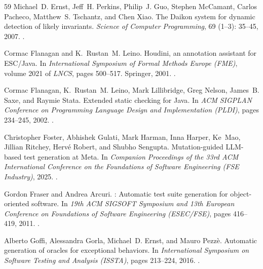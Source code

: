 \documentclass[11pt]{article}
\begin{document}
\begin{thebibliography}{59}
Michael~D. Ernst, Jeff~H. Perkins, Philip~J. Guo, Stephen McCamant, Carlos
  Pacheco, Matthew~S. Tschantz, and Chen Xiao.
\newblock The {Daikon} system for dynamic detection of likely invariants.
\newblock \emph{Science of Computer Programming}, 69 (1--3):
  35--45, 2007.
\newblock {}.

Cormac Flanagan and K.~Rustan~M. Leino.
\newblock Houdini, an annotation assistant for {ESC/Java}.
\newblock In \emph{International Symposium of Formal Methods Europe (FME)},
  volume 2021 of \emph{LNCS}, pages 500--517. Springer, 2001.
\newblock {}.

Cormac Flanagan, K.~Rustan~M. Leino, Mark Lillibridge, Greg Nelson, James~B.
  Saxe, and Raymie Stata.
\newblock Extended static checking for {Java}.
\newblock In \emph{ACM SIGPLAN Conference on Programming Language Design and
  Implementation (PLDI)}, pages 234--245, 2002.
\newblock {}.

Christopher Foster, Abhishek Gulati, Mark Harman, Inna Harper, Ke~Mao, Jillian
  Ritchey, Herv{\'e} Robert, and Shubho Sengupta.
\newblock Mutation-guided {LLM}-based test generation at {Meta}.
\newblock In \emph{Companion Proceedings of the 33rd ACM International
  Conference on the Foundations of Software Engineering (FSE Industry)}, 2025.
\newblock {}.

Gordon Fraser and Andrea Arcuri.
: Automatic test suite generation for object-oriented
  software.
\newblock In \emph{19th ACM SIGSOFT Symposium and 13th European Conference on
  Foundations of Software Engineering (ESEC/FSE)}, pages 416--419, 2011.
\newblock {}.

Alberto Goffi, Alessandra Gorla, Michael~D. Ernst, and Mauro Pezz\`{e}.
\newblock Automatic generation of oracles for exceptional behaviors.
\newblock In \emph{International Symposium on Software Testing and Analysis
  (ISSTA)}, pages 213--224, 2016.
\newblock {}.


\end{thebibliography}
\end{document}
